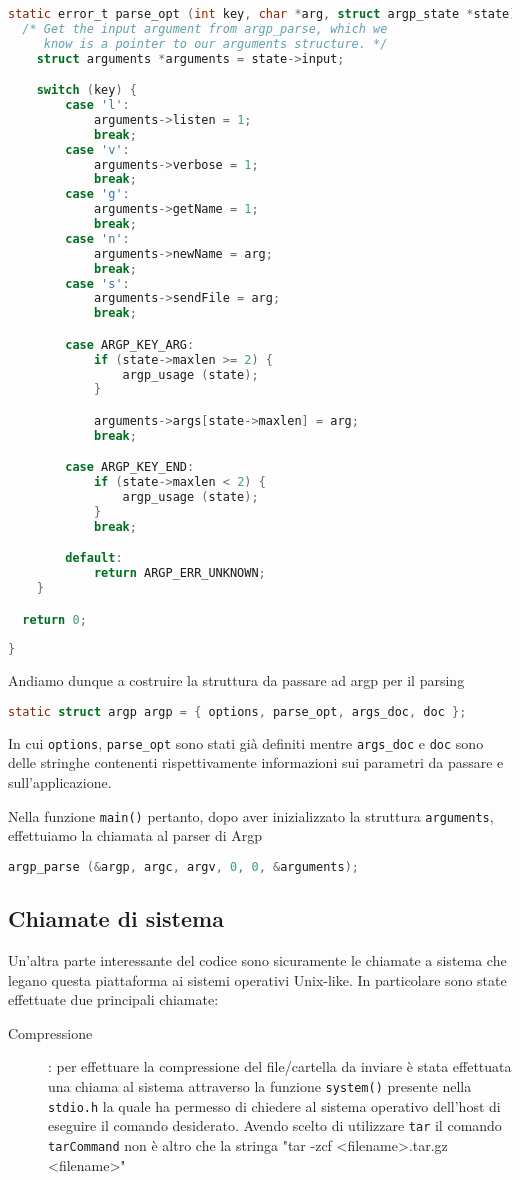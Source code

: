 \documentclass[11pt,fleqn]{book} %
\begin{document}
\begin{lstlisting}[language=C]
static error_t parse_opt (int key, char *arg, struct argp_state *state) {
  /* Get the input argument from argp_parse, which we
     know is a pointer to our arguments structure. */
  	struct arguments *arguments = state->input;

  	switch (key) {
    	case 'l':
      		arguments->listen = 1;
      		break;
    	case 'v':
      		arguments->verbose = 1;
      		break;
    	case 'g':
      		arguments->getName = 1;
      		break;
    	case 'n':
      		arguments->newName = arg;
      		break;
    	case 's':
      		arguments->sendFile = arg;
      		break;

    	case ARGP_KEY_ARG:
      		if (state->maxlen >= 2) {
        		argp_usage (state);
        	}

      		arguments->args[state->maxlen] = arg;
      		break;

    	case ARGP_KEY_END:
      		if (state->maxlen < 2) {
     			argp_usage (state);
     		}
      		break;

    	default:
      		return ARGP_ERR_UNKNOWN;
    }

  return 0;
  
}

\end{lstlisting}

\noindent Andiamo dunque a costruire la struttura da passare ad argp per il parsing
\begin{lstlisting}[language=C]
static struct argp argp = { options, parse_opt, args_doc, doc };
\end{lstlisting}
\noindent In cui \texttt{options}, \texttt{parse\_opt} sono stati già definiti mentre \texttt{args\_doc} e \texttt{doc} sono delle stringhe contenenti rispettivamente informazioni sui parametri da passare e sull'applicazione.

\noindent Nella funzione \texttt{main()} pertanto, dopo aver inizializzato la struttura \texttt{arguments}, effettuiamo la chiamata al parser di Argp

\begin{lstlisting}[language=C]
argp_parse (&argp, argc, argv, 0, 0, &arguments);
\end{lstlisting}


\subsection{Chiamate di sistema}
Un'altra parte interessante del codice sono sicuramente le chiamate a sistema che legano questa piattaforma ai sistemi operativi Unix-like.
In particolare sono state effettuate due principali chiamate:
\begin{description}
	\item[Compressione]: per effettuare la compressione del file/cartella da inviare è stata effettuata una chiama al sistema attraverso la funzione 			\texttt{system()} presente nella \texttt{stdio.h} la quale ha permesso di chiedere al sistema operativo dell'host di eseguire il comando 				desiderato. Avendo scelto di utilizzare \texttt{tar} il comando \texttt{tarCommand} non è altro che la stringa "tar -zcf <filename>.tar.gz 			<filename>"
\end{description}
\end{document}
